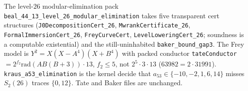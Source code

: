 \documentclass[12pt]{amsart}
\begin{document}
The level-$26$ modular-elimination pack
\texttt{beal\_44\_13\_level\_26\_modular\_elimination}
takes five transparent cert structures
(\texttt{J0DecompositionCert\_26},
\texttt{MwrankCertificate\_26},
\texttt{FormalImmersionCert\_26},
\texttt{FreyCurveCert},
\texttt{LevelLoweringCert\_26};
soundness is a computable existential)
and the still-uninhabited
\texttt{baker\_bound\_gap3}.
The Frey model is
$Y^2=X(X-A^4)(X+B^4)$ with packed
conductor \texttt{tateConductor}
$=2^{f_2}\mathrm{rad}(AB(B+3))\cdot 13$,
$f_2\le 5$, not $2^5\cdot 3\cdot 13$
($63982=2\cdot 31991$).
\texttt{kraus\_a53\_elimination} is the
kernel decide that
$a_{53}\in\{-10,-2,1,6,14\}$ misses
$S_2(26)$ traces $\{0,12\}$.
Tate and Baker files are unchanged.
\end{document}
